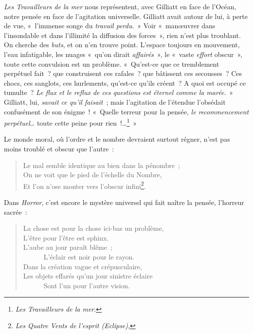 \documentclass[french,twoside]{book} %
\begin{document}
\noindent \emph{Les Travailleurs de la mer} nous représentent, avec Gilliatt en face de l’Océan, notre pensée en face de l’agitation universelle. Gilliatt avait autour de lui, à perte de vue, « l’immense songe du \emph{travail perdu}. » Voir « manœuvrer dans l’insondable et dans l’illimité la diffusion des forces », rien n’est plus troublant. On cherche des \emph{buts}, et on n’en trouve point. L’espace toujours en mouvement, l’eau infatigable, les nuages « qu’on dirait \emph{affairés} », le « vaste \emph{effort} obscur », toute cette convulsion est un problème. « Qu’est-ce que ce tremblement perpétuel fait ? que construisent ces rafales ? que bâtissent ces secousses ? Ces chocs, ces sanglots, ces hurlements, qu’est-ce qu’ils créent ? A quoi est occupé ce tumulte ? \emph{Le flux et le reflux de ces questions est éternel comme la marée}. » Gilliatt, lui, \emph{savait ce qu’il faisait} ; mais l’agitation de l’étendue l’obsédait confusément de son énigme ! « Quelle terreur pour la pensée, \emph{le recommencement perpétuel}… toute cette peine pour rien !…\footnote{\emph{Les Travailleurs de la mer}.} »\par
Le monde moral, où l’ordre et le nombre devraient surtout régner, n’est pas moins troublé et obscur que l’autre :\par


\begin{verse}
Le mal semble identique au bien dans la pénombre ;\\
On ne voit que le pied de l’échelle du Nombre,\\
Et l’on n’ose monter vers l’obscur infini\footnote{\emph{Les Quatre Vents de l’esprit (Eclipse)},}.\\
\end{verse}

\noindent Dans \emph{Horror}, c’est encore le mystère universel qui fait naître la pensée, l’horreur sacrée :\par


\begin{verse}
La chose est pour la chose ici-bas un problème,\\
L’être pour l’être est sphinx.\\
L’aube au jour paraît blême ;\\
      L’éclair est noir pour le rayon.\\
Dans la création vague et crépusculaire,\\
Les objets effarés qu’un jour sinistre éclaire\\
      Sont l’un pour l’autre vision.\\
\end{verse}
\end{document}
